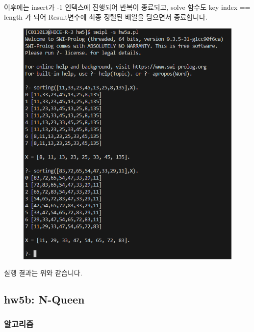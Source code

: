 \documentclass{article}
\begin{document}
이후에는 insert가 -1 인덱스에 진행되어 반복이 종료되고, solve 함수도 key index == length 가 되어 Result변수에 최종 정렬된 배열을 담으면서 종료합니다.
\newpage
\begin{figure}
    \centering
    \includegraphics[width=0.8\linewidth]{hw5a_7.png}
\end{figure}
실행 결과는 위와 같습니다.
\subsection{hw5b: N-Queen}
\subsubsection{알고리즘}
\end{document}

